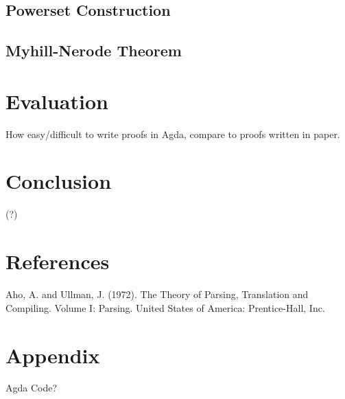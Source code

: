 \documentclass[twoside,openright,final]{bhamthesis}
\begin{document}
\subsection{Powerset Construction}

\subsection{Myhill-Nerode Theorem}

\section{Evaluation}
How easy/difficult to write proofs in Agda, compare to proofs written
in paper.

\section{Conclusion}
(?)

\section{References}
Aho, A. and Ullman, J. (1972). The Theory of Parsing, Translation and Compiling. Volume I: Parsing. United States of America: Prentice-Hall, Inc.

\section{Appendix}
Agda Code?
\end{document}
